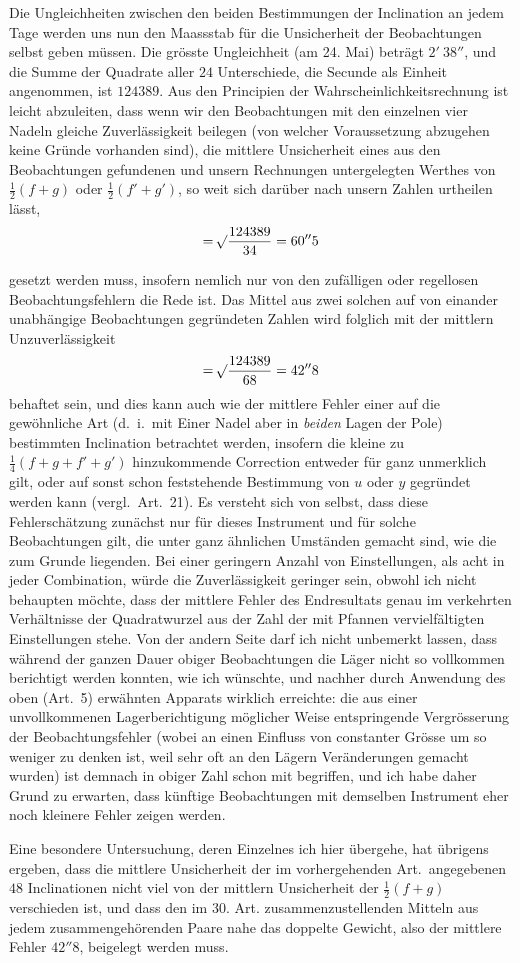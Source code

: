 Die Ungleichheiten zwischen den beiden Bestimmungen der Inclination an jedem Tage werden uns nun den Maassstab für die Unsicherheit der Beobachtungen selbst geben müssen. Die grösste Ungleichheit (am 24. Mai) beträgt $2'\ 38''$, und die Summe der Quadrate aller $24$ Unterschiede, die Secunde als Einheit angenommen, ist $124389$. Aus den Principien der Wahrscheinlichkeitsrechnung ist leicht abzuleiten, dass wenn wir den Beobachtungen mit den einzelnen vier Nadeln gleiche Zuverlässigkeit beilegen (von welcher Voraussetzung abzugehen keine Gründe vorhanden sind), die mittlere Unsicherheit eines aus den Beobachtungen gefundenen und unsern Rechnungen untergelegten Werthes von $\tfrac12(f+g)$ oder $\tfrac12(f'+g')$, so weit sich darüber nach unsern Zahlen urtheilen lässt,
\[
=\mathord{{}^{}\!\surd}\frac{124389}{34}=60''5
\]
\par\clearpage
{}
\noindent gesetzt werden muss, insofern nemlich nur von den zufälligen oder regellosen Beobachtungsfehlern die Rede ist. Das Mittel aus zwei solchen auf von einander unabhängige Beobachtungen gegründeten Zahlen wird folglich mit der mittlern Unzuverlässigkeit
\[
=\mathord{{}^{}\!\surd}\frac{124389}{68}=42''8
\]
behaftet sein, und dies kann auch wie der mittlere Fehler einer auf die gewöhnliche Art (d.\ i.\ mit Einer Nadel aber in \textit{beiden} Lagen der Pole) bestimmten Inclination betrachtet werden, insofern die kleine zu $\tfrac14(f+g+f'+g')$ hinzukommende Correction entweder für ganz unmerklich gilt, oder auf sonst schon feststehende Bestimmung von $u$ oder $y$ gegründet werden kann (vergl.\ Art.\ 21). Es versteht sich von selbst, dass diese Fehlerschätzung zunächst nur für dieses Instrument und für solche Beobachtungen gilt, die unter ganz ähnlichen Umständen gemacht sind, wie die zum Grunde liegenden. Bei einer geringern Anzahl von Einstellungen, als acht in jeder Combination, würde die Zuverlässigkeit geringer sein, obwohl ich nicht behaupten möchte, dass der mittlere Fehler des Endresultats genau im verkehrten Verhältnisse der Quadratwurzel aus der Zahl der mit Pfannen vervielfältigten Einstellungen stehe. Von der andern Seite darf ich nicht unbemerkt lassen, dass während der ganzen Dauer obiger Beobachtungen die Läger nicht so vollkommen berichtigt werden konnten, wie ich wünschte, und nachher durch Anwendung des oben (Art.\ 5) erwähnten Apparats wirklich erreichte: die aus einer unvollkommenen Lagerberichtigung möglicher Weise entspringende Vergrösserung der Beobachtungsfehler (wobei an einen Einfluss von constanter Grösse um so weniger zu denken ist, weil sehr oft an den Lägern Veränderungen gemacht wurden) ist demnach in obiger Zahl schon mit begriffen, und ich habe daher Grund zu erwarten, dass künftige Beobachtungen mit demselben Instrument eher noch kleinere Fehler zeigen werden.

Eine besondere Untersuchung, deren Einzelnes ich hier übergehe, hat übrigens ergeben, dass die mittlere Unsicherheit der im vorhergehenden Art.\ angegebenen $48$ Inclinationen nicht viel von der mittlern Unsicherheit der $\tfrac12(f+g)$ verschieden ist, und dass den im 30. Art. zusammenzustellenden Mitteln aus jedem zusammengehörenden Paare nahe das doppelte Gewicht, also der mittlere Fehler $42''8$, beigelegt werden muss.
